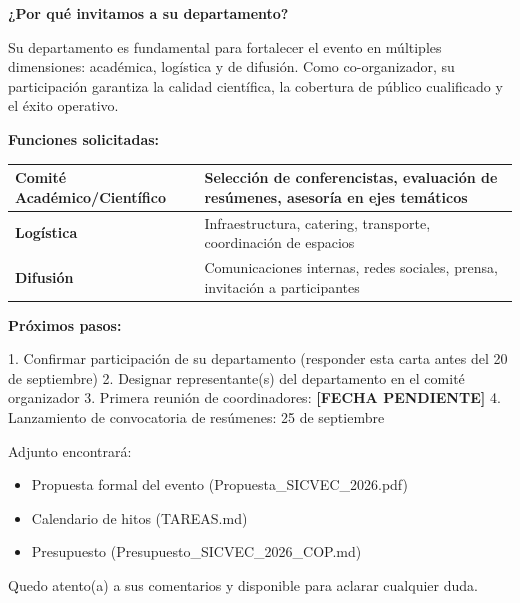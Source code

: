 \documentclass[12pt,a4paper]{article}
\begin{document}
\vspace{0.8cm}

\textbf{¿Por qué invitamos a su departamento?}

Su departamento es fundamental para fortalecer el evento en múltiples dimensiones: académica, logística y de difusión. Como co-organizador, su participación garantiza la calidad científica, la cobertura de público cualificado y el éxito operativo.

\vspace{1cm}

\textbf{Funciones solicitadas:}

\begin{tabular}{|l|p{10cm}|}
\hline
\textbf{Comité Académico/Científico} & Selección de conferencistas, evaluación de resúmenes, asesoría en ejes temáticos \\
\hline
\textbf{Logística} & Infraestructura, catering, transporte, coordinación de espacios \\
\hline
\textbf{Difusión} & Comunicaciones internas, redes sociales, prensa, invitación a participantes \\
\hline
\end{tabular}

\vspace{1cm}

\textbf{Próximos pasos:}

1. Confirmar participación de su departamento (responder esta carta antes del 20 de septiembre)
2. Designar representante(s) del departamento en el comité organizador
3. Primera reunión de coordinadores: \textbf{[FECHA PENDIENTE]}
4. Lanzamiento de convocatoria de resúmenes: 25 de septiembre

\vspace{1cm}

Adjunto encontrará:
\begin{itemize}
  \item Propuesta formal del evento (Propuesta\_SICVEC\_2026.pdf)
  \item Calendario de hitos (TAREAS.md)
  \item Presupuesto (Presupuesto\_SICVEC\_2026\_COP.md)
\end{itemize}

\vspace{1cm}

Quedo atento(a) a sus comentarios y disponible para aclarar cualquier duda.

\vspace{1.5cm}
\end{document}
